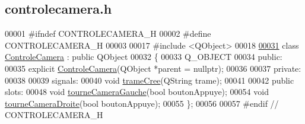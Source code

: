 \hypertarget{controlecamera_8h_source}{}\subsection{controlecamera.\+h}

\begin{DoxyCode}
00001 \textcolor{preprocessor}{#ifndef CONTROLECAMERA\_H}
00002 \textcolor{preprocessor}{#define CONTROLECAMERA\_H}
00003 
00017 \textcolor{preprocessor}{#include <QObject>}
00018 
\hyperlink{class_controle_camera}{00031} \textcolor{keyword}{class }\hyperlink{class_controle_camera}{ControleCamera} : \textcolor{keyword}{public} QObject
00032 \{
00033     Q\_OBJECT
00034 \textcolor{keyword}{public}:
00035     \textcolor{keyword}{explicit} \hyperlink{class_controle_camera_afe5dd4f7158c6c18c78b52253fe78327}{ControleCamera}(QObject *parent = \textcolor{keyword}{nullptr});
00036 
00037 \textcolor{keyword}{private}:
00038 
00039 signals:
00040     \textcolor{keywordtype}{void} \hyperlink{class_controle_camera_ae6fda972cd90c8a14bc1c0171e1600e5}{trameCree}(QString trame); 
00041 
00042 \textcolor{keyword}{public} slots:
00048     \textcolor{keywordtype}{void} \hyperlink{class_controle_camera_a119562aacbb4c0fbd4e5aa27a05ce7cc}{tourneCameraGauche}(\textcolor{keywordtype}{bool} boutonAppuye);
00054     \textcolor{keywordtype}{void} \hyperlink{class_controle_camera_aac294c4e98a912199ba32d686e52f7ef}{tourneCameraDroite}(\textcolor{keywordtype}{bool} boutonAppuye);
00055 \};
00056 
00057 \textcolor{preprocessor}{#endif // CONTROLECAMERA\_H}
\end{DoxyCode}
